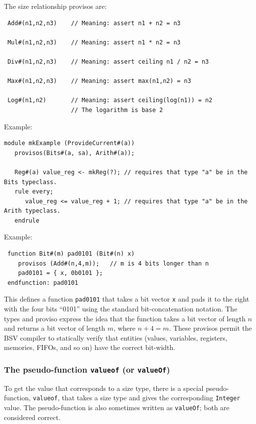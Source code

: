 \documentclass[twoside,letterpaper]{article}
\newcommand{\BSV}{BSV}
\newcommand{\te}[1]{\texttt{#1}}
\begin{document}
The size relationship provisos are:
\begin{verbatim}
 Add#(n1,n2,n3)    // Meaning: assert n1 + n2 = n3

 Mul#(n1,n2,n3)    // Meaning: assert n1 * n2 = n3

 Div#(n1,n2,n3)    // Meaning: assert ceiling n1 / n2 = n3
   
 Max#(n1,n2,n3)    // Meaning: assert max(n1,n2) = n3

 Log#(n1,n2)       // Meaning: assert ceiling(log(n1)) = n2
                   // The logarithm is base 2
\end{verbatim}
Example:
\begin{verbatim}
module mkExample (ProvideCurrent#(a))
   provisos(Bits#(a, sa), Arith#(a));

   Reg#(a) value_reg <- mkReg(?); // requires that type "a" be in the Bits typeclass.
   rule every;
      value_reg <= value_reg + 1; // requires that type "a" be in the Arith typeclass.
   endrule
\end{verbatim}
Example:
\begin{verbatim}
 function Bit#(m) pad0101 (Bit#(n) x)
    provisos (Add#(n,4,m));   // m is 4 bits longer than n
    pad0101 = { x, 0b0101 };
 endfunction: pad0101
\end{verbatim}
This defines a function \texttt{pad0101} that takes a bit vector \texttt{x}
and pads it to the right with the four bits ``0101'' using the standard
bit-concatenation notation.  The types and proviso express the idea
that the function takes a bit vector of length $n$ and returns a bit
vector of length $m$, where $n+4=m$.  These provisos permit the {\BSV}
compiler to statically verify that entities (values, variables,
registers, memories, FIFOs, and so on) have the correct bit-width.


\subsubsection{The pseudo-function \te{valueof} (or \te{valueOf})}

\label{sec-valueof}

To get the value that corresponds to a size type, there is a special
pseudo-function, \texttt{valueof},
that takes a size type and gives the corresponding \texttt{Integer}
value.  The pseudo-function is also sometimes written as
\texttt{valueOf}; both are considered correct.
\end{document}
